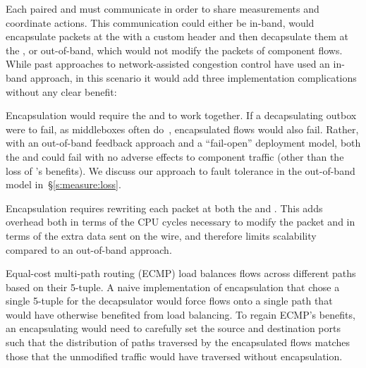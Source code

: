 

\label{s:design:oob}
Each paired \inbox and \outbox must communicate in order to share measurements and coordinate actions. 
This communication could either be in-band, \ie would encapsulate packets
at the \inbox with a custom header and then decapsulate them at the \outbox, or out-of-band,
which would not modify the packets of component flows.
While past approaches to network-assisted congestion control have used an in-band approach, in this scenario it would add three implementation complications without any clear benefit:

 Encapsulation would require the \inbox and \outbox to work together. 
If a decapsulating outbox were to fail, as middleboxes often do~\cite{aplomb}, encapsulated flows would also fail.
Rather, with an out-of-band feedback approach and a ``fail-open'' deployment model, both the \inbox and \outbox could fail with no adverse effects to component traffic (other than the loss of \name's benefits). We discuss our approach to fault tolerance in the out-of-band model in~\S\ref{s:measure:loss}.

 Encapsulation requires rewriting each packet at both the \inbox and \outbox. 
This adds overhead both in terms of the CPU cycles necessary to modify the packet and in terms of the extra data sent on the wire, and therefore limits scalability compared to an out-of-band approach. 

 Equal-cost multi-path routing (ECMP) load balances flows across different paths based on their 5-tuple. 
A naive implementation of encapsulation that chose a single 5-tuple for the decapsulator would force flows onto a single path that would have otherwise benefited from load balancing. 
To regain ECMP's benefits, an encapsulating \name would need to carefully set the source and destination ports such that the distribution of paths traversed by the encapsulated flows matches those that the unmodified traffic would have traversed without encapsulation. 


